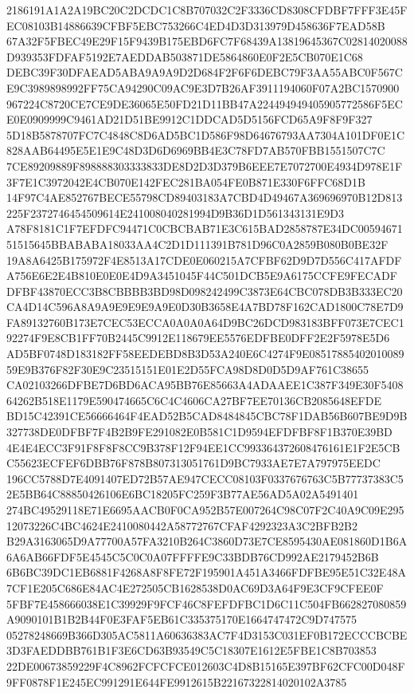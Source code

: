 \documentclass[UTF8,fontset=fandol,zihao=-4,a4paper]{ctexart}
\begin{document}
{{2186191A1A2A19BC20C2DCDC1C8B707032C2F3336CD8308CFDBF7FFF3E45FEC08103B14886639CFBF5EBC753266C4ED4D3D313979D458636F7EAD58B
67A32F5FBEC49E29F15F9439B175EBD6FC7F68439A13819645367C02814020088D939353FDFAF5192E7AEDDAB503871DE5864860E0F2E5CB070E1C68
DEBC39F30DFAEAD5ABA9A9A9D2D684F2F6F6DEBC79F3AA55ABC0F567CE9C3989898992FF75CA94290C09AC9E3D7B26AF3911194060F07A2BC1570900
967224C8720CE7CE9DE36065E50FD21D11BB47A224494949405905772586F5ECE0E0909999C9461AD21D51BE9912C1DDCAD5D5156FCD65A9F8F9F327
5D18B5878707FC7C4848C8D6AD5BC1D586F98D64676793AA7304A101DF0E1C828AAB64495E5E1E9C48D3D6D6969BB4E3C78FD7AB570FBB1551507C7C
7CE89209889F898888303333833DE8D2D3D379B6EEE7E7072700E4934D978E1F3F7E1C3972042E4CB070E142FEC281BA054FE0B871E330F6FFC68D1B
14F97C4AE852767BECE55798CD89403183A7CBD4D49467A369696970B12D813225F2372746454509614E241008040281994D9B36D1D561343131E9D3
A78F8181C1F7EFDFC94471C0CBCBAB71E3C615BAD2858787E34DC0059467151515645BBABABA18033AA4C2D1D111391B781D96C0A2859B080B0BE32F
19A8A6425B175972F4E8513A17CDE0E060215A7CFBF62D9D7D556C417AFDFA756E6E2E4B810E0E0E4D9A3451045F44C501DCB5E9A6175CCFE9FECADF
DFBF43870ECC3B8CBBBB3BD98D098242499C3873E64CBC078DB3B333EC20CA4D14C596A8A9A9E9E9E9A9E0D30B3658E4A7BD78F162CAD1800C78E7D9
FA89132760B173E7CEC53ECCA0A0A0A64D9BC26DCD983183BFF073E7CEC192274F9E8CB1FF70B2445C9912E118679EE5576EDFBE0DFF2E2F5978E5D6
AD5BF0748D183182FF58EEDEBD8B3D53A240E6C4274F9E0851788540201008959E9B376F82F30E9C23515151E01E2D55FCA98D8D0D5D9AF761C38655
CA02103266DFBE7D6BD6ACA95BB76E85663A4ADAAEE1C387F349E30F540864262B518E1179E590474665C6C4C4606CA27BF7EE70136CB2085648EFDE
BD15C42391CE56666464F4EAD52B5CAD8484845CBC78F1DAB56B607BE9D9B327738DE0DFBF7F4B2B9FE291082E0B581C1D9594EFDFBF8F1B370E39BD
4E4E4ECC3F91F8F8F8CC9B378F12F94EE1CC993364372608476161E1F2E5CBC55623ECFEF6DBB76F878B807313051761D9BC7933AE7E7A797975EEDC
196CC5788D7E4091407ED72B57AE947CECC08103F0337676763C5B77737383C52E5BB64C88850426106E6BC18205FC259F3B77AE56AD5A02A5491401
274BC49529118E71E6695AACB0F0CA952B57E007264C98C07F2C40A9C09E29512073226C4BC4624E2410080442A58772767CFAF4292323A3C2BFB2B2
B29A3163065D9A77700A57FA3210B264C3860D73E7CE8595430AE081860D1B6A6A6AB66FDF5E4545C5C0C0A07FFFFE9C33BDB76CD992AE2179452B6B
6B6BC39DC1EB6881F4268A8F8FE72F195901A451A3466FDFBE95E51C32E48A7CF1E205C686E84AC4E272505CB1628538D0AC69D3A64F9E3CF9CFEE0F
5FBF7E458666038E1C39929F9FCF46C8FEFDFBC1D6C11C504FB662827080859A9090101B1B2B44F0E3FAF5EB61C335375170E1664747472C9D747575
05278248669B366D305AC5811A60636383AC7F4D3153C031EF0B172ECCCBCBE3D3FAEDDBB761B1F3E6CD63B93549C5C18307E1612E5FBE1C8B703853
22DE00673859229F4C8962FCFCFCE012603C4D8B15165E397BF62CFC00D048F9FF0878F1E245EC991291E644FE9912615B22167322814020102A3785
}}
\end{document}
